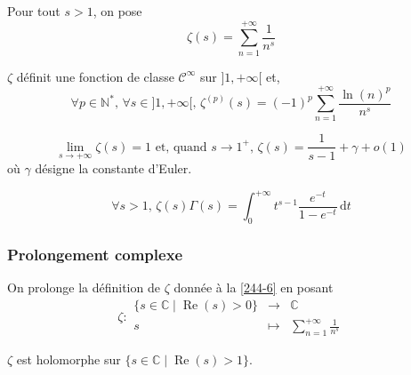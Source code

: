   \begin{definition}
    \label{244-6}
    Pour tout $s > 1$, on pose
    \[ \zeta(s) = \sum_{n=1}^{+\infty} \frac{1}{n^s} \]
  \end{definition}

  \begin{proposition}
    $\zeta$ définit une fonction de classe $\mathcal{C}^\infty$ sur $]1, +\infty[$ et,
    \[ \forall p \in \mathbb{N}^*, \, \forall s \in ]1, +\infty[, \, \zeta^{(p)}(s) = (-1)^p\sum_{n=1}^{+\infty} \frac{\ln(n)^p}{n^s} \]
  \end{proposition}

  \begin{proposition}
    \[ \lim_{s \rightarrow +\infty} \zeta(s) = 1 \text{ et, quand } s \longrightarrow 1^+, \, \zeta(s) = \frac{1}{s-1} + \gamma + o(1) \]
    où $\gamma$ désigne la constante d'Euler.
  \end{proposition}


  \begin{proposition}
    \[ \forall s > 1, \, \zeta(s) \Gamma(s) = \int_0^{+\infty} t^{s-1} \frac{e^{-t}}{1 - e^{-t}} \, \mathrm{d}t \]
  \end{proposition}

  \subsubsection{Prolongement complexe}


  \begin{proposition}
    On prolonge la définition de $\zeta$ donnée à la \cref{244-6} en posant
    \[
      \zeta :
      \begin{array}{ccc}
        \{ s \in \mathbb{C} \mid \operatorname{Re}(s) > 0 \} &\rightarrow& \mathbb{C} \\
        s &\mapsto& \sum_{n=1}^{+\infty} \frac{1}{n^s}
      \end{array}
    \]
  \end{proposition}

  \begin{proposition}
    $\zeta$ est holomorphe sur $\{ s \in \mathbb{C} \mid \operatorname{Re}(s) > 1 \}$.
  \end{proposition}


